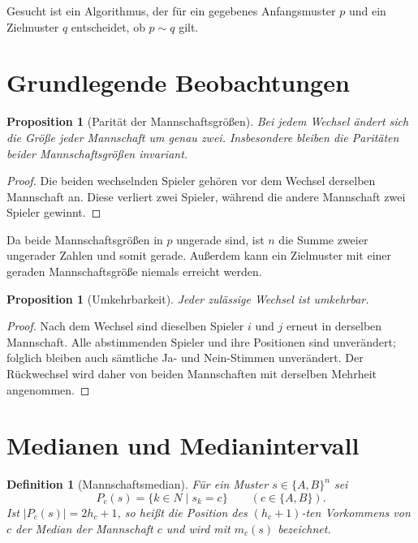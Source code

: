 \documentclass[12pt]{article}
\newtheorem{definition}[satz]{Definition}
\newtheorem{proposition}[satz]{Proposition}
\newcommand{\card}[1]{\left\lvert #1\right\rvert}
\begin{document}
Gesucht ist ein Algorithmus, der für ein gegebenes Anfangsmuster $p$ und ein
Zielmuster $q$ entscheidet, ob $p\sim q$ gilt.

\section{Grundlegende Beobachtungen}

\begin{proposition}[Parität der Mannschaftsgrößen]
Bei jedem Wechsel ändert sich die Größe jeder Mannschaft um genau zwei.
Insbesondere bleiben die Paritäten beider Mannschaftsgrößen invariant.
\end{proposition}

\begin{proof}
Die beiden wechselnden Spieler gehören vor dem Wechsel derselben Mannschaft
an. Diese verliert zwei Spieler, während die andere Mannschaft zwei Spieler
gewinnt.
\end{proof}

Da beide Mannschaftsgrößen in $p$ ungerade sind, ist $n$ die Summe zweier
ungerader Zahlen und somit gerade. Außerdem kann ein Zielmuster mit einer
geraden Mannschaftsgröße niemals erreicht werden.

\begin{proposition}[Umkehrbarkeit]
Jeder zulässige Wechsel ist umkehrbar.
\end{proposition}

\begin{proof}
Nach dem Wechsel sind dieselben Spieler $i$ und $j$ erneut in derselben
Mannschaft. Alle abstimmenden Spieler und ihre Positionen sind unverändert;
folglich bleiben auch sämtliche Ja- und Nein-Stimmen unverändert. Der
Rückwechsel wird daher von beiden Mannschaften mit derselben Mehrheit
angenommen.
\end{proof}

\section{Medianen und Medianintervall}

\begin{definition}[Mannschaftsmedian]
Für ein Muster $s\in\{A,B\}^n$ sei
\[
P_c(s)=\{k\in N\mid s_k=c\}
\qquad(c\in\{A,B\}).
\]
Ist $\card{P_c(s)}=2h_c+1$, so heißt die Position des $(h_c+1)$-ten
Vorkommens von $c$ der \emph{Median} der Mannschaft $c$ und wird mit
$m_c(s)$ bezeichnet.
\end{definition}
\end{document}

